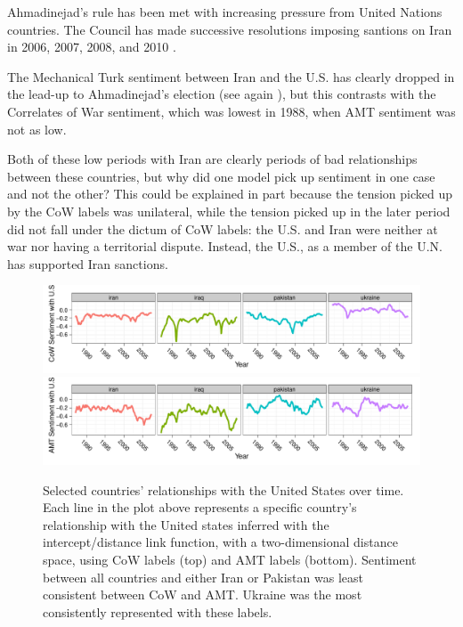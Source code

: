 \begin{itemize}
    Ahmadinejad's rule has been met with increasing pressure from
    United Nations countries.  The Council has made successive
    resolutions imposing santions on Iran in 2006, 2007, 2008, and
    2010 \citep{iranstate:2012}.

    The Mechanical Turk sentiment between Iran and the U.S. has
    clearly dropped in the lead-up to Ahmadinejad's election (see
    again ), but this contrasts
    with the Correlates of War sentiment, which was lowest in 1988,
    when AMT sentiment was not as low.

\end{itemize}
 
Both of these low periods with Iran are clearly periods of bad
relationships between these countries, but why did one model pick up
sentiment in one case and not the other?  This could be explained in
part because the tension picked up by the CoW labels was unilateral,
while the tension picked up in the later period did not fall under the
dictum of CoW labels: the U.S. and Iran were neither at war nor having
a territorial dispute.  Instead, the U.S., as a member of the U.N. has
supported Iran sanctions.


\begin{figure}
  \center
    \includegraphics[width=1\textwidth]{chapter_foreign_relations/figures/012_fr_cow_mutual_sentiment_with_us.pdf}
    \includegraphics[width=1\textwidth]{chapter_foreign_relations/figures/012_fr_mturk_mutual_sentiment_with_us.pdf}
  \label{fig:country_positions_over_time}
  \caption{Selected countries' relationships with the United States
    over time.  Each line in the plot above represents a specific
    country's relationship with the United states inferred with the
    intercept/distance link function, with a two-dimensional distance
    space, using CoW labels (top) and AMT labels (bottom).  Sentiment
    between all countries and either Iran or Pakistan was
    least consistent between CoW and AMT. Ukraine was
    the most consistently represented with these labels.}
\end{figure}

